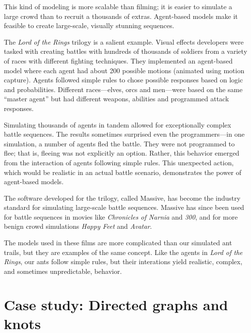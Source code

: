 \documentclass[10pt]{book}
\begin{document}
This kind of modeling is more scalable than filming; it is easier to
simulate a large crowd than to recruit a thousands of extras.
Agent-based models make it feasible to create large-scale, visually
stunning sequences.

The \emph{Lord of the Rings} trilogy is a salient example.  Visual
effects developers were tasked with creating battles with hundreds of
thousands of soldiers from a variety of races with different fighting
techniques.  They implemented an agent-based model where each agent
had about 200 possible motions (animated using motion capture).
Agents followed simple rules to chose possible responses based on
logic and probabilities.  Different races---elves, orcs and
men---were based on the same ``master agent'' but had different
weapons, abilities and programmed attack responses.

Simulating thousands of agents in tandem allowed for exceptionally
complex battle sequences.  The results sometimes surprised even the
programmers---in one simulation, a number of agents fled the battle.
They were not programmed to flee; that is, fleeing was not explicitly
an option.  Rather, this behavior emerged from the interaction of
agents following simple rules.
This unexpected action, which would be realistic in
an actual battle scenario, demonstrates the power of agent-based models.


The software developed for the trilogy, called Massive, has become the
industry standard for simulating large-scale battle sequences.
Massive has since been used for battle sequences in
movies like \emph{Chronicles of Narnia} and \emph{300}, and for
more benign crowd simulations \emph{Happy Feet} and
\emph{Avatar}.

The models used in these films are more complicated than our simulated
ant trails, but they are examples of the same concept.  Like the
agents in \emph{Lord of the Rings}, our ants follow simple rules, but
their interations yield realistic, complex, and sometimes
unpredictable, behavior.


\chapter{Case study: Directed graphs and knots}
\end{document}
